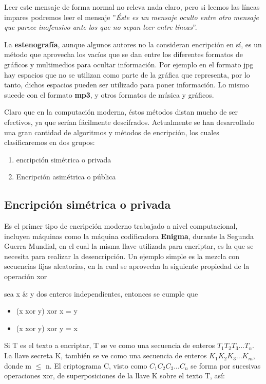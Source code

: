 Leer este mensaje de forma normal no releva nada claro, pero si leemos
las líneas impares podremos leer el mensaje ''\textit{Éste es un
  mensaje oculto entre otro mensaje que parece inofensivo ante los que
  no sepan leer entre líneas}''.

La \textbf{estenografía}, aunque algunos autores no la consideran
encripción en sí, es un método que aprovecha los vacíos que se dan
entre los diferentes formatos de gráficos y multimedios para ocultar
información.  Por ejemplo en el formato jpg hay espacios que no se
utilizan como parte de la gráfica que representa, por lo tanto, dichos
espacios pueden ser utilizado para poner información.  Lo mismo sucede
con el formato \textbf{mp3}, y otros formatos de música y gráficos.

Claro que en la computación moderna, éstos métodos distan mucho de ser
efectivos, ya que serían fácilmente descifrados.  Actualmente se han
desarrollado una gran cantidad de algoritmos y métodos de encripción,
los cuales clasificaremos en dos grupos:

\begin{enumerate}
\item encripción simétrica o privada
\item Encripción asimétrica o pública
\end{enumerate}

\subsection{Encripción simétrica o privada}
\label{sec:encr-simetr-o}

Es el primer tipo de encripción moderno trabajado a nivel
computacional, incluyen máquinas como la máquina codificadora
\textbf{Enigma}, durante la Segunda Guerra Mundial, en el cual la
misma llave utilizada para encriptar, es la que se necesita para
realizar la desencripción. Un ejemplo simple es la mezcla con
secuencias fijas aleatorias, en la cual se aprovecha la siguiente
propiedad de la operación xor

sea x \& y dos enteros independientes, entonces se cumple que
\begin{itemize}
\item (x xor y) xor x = y
\item (x xor y) xor y = x
\end{itemize}

Si T es el texto a encriptar, T se ve como una secuencia de enteros
$T_1T_2T_3...T_n$.  La llave secreta K, también se ve como una
secuencia de enteros $K_1K_2K_3...K_m$, donde m $\leq$ n.  El
criptograma C, visto como $C_1C_2C_3...C_n$ se forma por sucesivas
operaciones xor, de superposiciones de la llave K sobre el texto T,
así:

